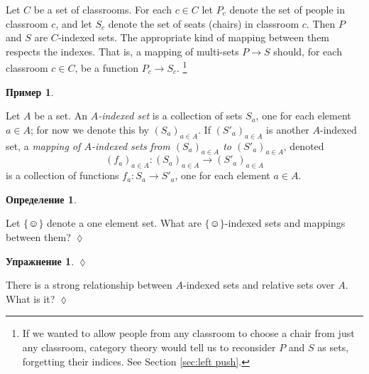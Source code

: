 \documentclass[a4paper]{book}
\def\singleton{\{\smiley\}}
\def\to{\rightarrow}
\def\taking{\colon}
\theoremstyle{myth}
\newtheorem{exampleENG}[envENG]{\begin{english}Example\end{english}}
\newtheorem{excENG}[envENG]{\begin{english}Exercise\end{english}}
\newtheorem{definitionENG}[envENG]{\begin{english}Definition\end{english}}
\newenvironment{exerciseENG}{\begin{excENG}}{\hspace*{\fill}$\lozenge$\end{excENG}}
\newtheorem{exampleRUS}[envRUS]{Пример}
\newtheorem{excRUS}[envRUS]{Упражнение}
\newtheorem{definitionRUS}[envRUS]{Определение}
\newenvironment{exerciseRUS}{\begin{excRUS}}{\hspace*{\fill}$\lozenge$\end{excRUS}}
\begin{document}
\begin{russian}
 

\begin{exampleENG}\label{ex:classroom seats}
Let $C$ be a set of classrooms. For each $c\in C$ let $P_c$ denote the set of people in classroom $c$, and let $S_c$ denote the set of seats (chairs) in classroom $c$. Then $P$ and $S$ are $C$-indexed sets. The appropriate kind of mapping between them respects the indexes. That is, a mapping of multi-sets $P\to S$ should, for each classroom $c\in C$, be a function $P_c\to S_c$.%
\footnote{If we wanted to allow people from any classroom to choose a chair from just any classroom, category theory would tell us to reconsider $P$ and $S$ as sets, forgetting their indices. See Section \ref{sec:left push}.}
\end{exampleENG}

\begin{exampleRUS}\label{ex:classroom seats}
 
\end{exampleRUS}

\begin{definitionENG}\label{def:indexed sets}
Let $A$ be a set. An {\em $A$-indexed set} is a collection of sets $S_a$, one for each element $a\in A$; for now we denote this by $(S_a)_{a\in A}$. If $(S'_a)_{a\in A}$ is another $A$-indexed set, a {\em mapping of $A$-indexed sets from $(S_a)_{a\in A}$ to $(S'_a)_{a\in A}$}, denoted $$(f_a)_{a\in A}\taking(S_a)_{a\in A}\to (S'_a)_{a\in A}$$ is a collection of functions $f_a\taking S_a\to S'_a$, one for each element $a\in A$.
\end{definitionENG}

\begin{definitionRUS}\label{def:indexed sets}
 
\end{definitionRUS}

\begin{exerciseENG}
Let $\singleton$ denote a one element set. What are $\singleton$-indexed sets and mappings between them?
\end{exerciseENG}

\begin{exerciseRUS}
 
\end{exerciseRUS}

\begin{exerciseENG}
There is a strong relationship between $A$-indexed sets and relative sets over $A$. What is it?
\end{exerciseENG}


\end{russian}
\end{document}
